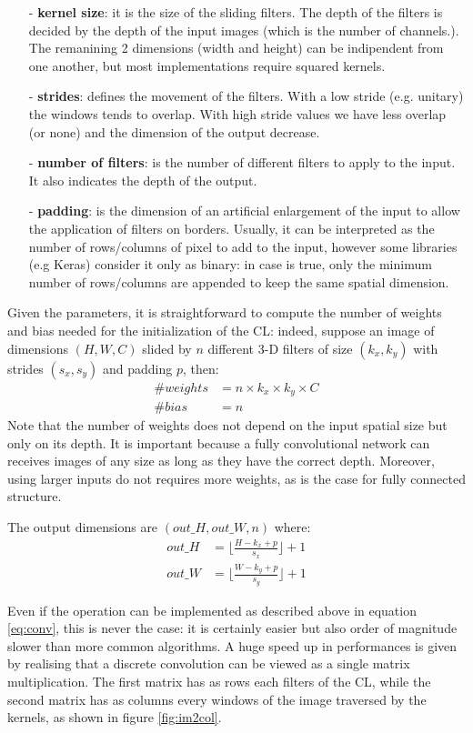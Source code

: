 \documentclass[12pt,a4paper]{report}
\begin{document}
\begin{itemize}
 \setlength\itemsep{-0.2em}
 \item [-] {\bf kernel size}: it is the size of the sliding filters. The depth of the filters is decided by the depth of the input images (which is the number of channels.). The remanining 2 dimensions (width and height) can be indipendent from one another, but most implementations require squared kernels.
 \item [-] {\bf strides}: defines the movement of the filters. With a low stride (e.g. unitary) the windows tends to overlap. With high stride values we have less overlap (or none) and the dimension of the output decrease.
 \item [-] {\bf number of filters}: is the number of different filters to apply to the input. It also indicates the depth of the output.
 \item [-] {\bf padding}: is the dimension of an artificial enlargement of the input to allow the application of filters on borders. Usually, it can be interpreted as the number of rows/columns of pixel to add to the input, however some libraries (e.g Keras) consider it only as binary: in case is true, only the minimum number of rows/columns are appended to keep the same spatial dimension.
\end{itemize}
Given the parameters, it is straightforward to compute the number of weights and bias needed for the initialization of the CL: indeed, suppose an image of dimensions $(H, W, C)$ slided by $n$ different 3-D filters of size $(k_x, k_y)$ with strides $(s_x, s_y)$ and padding $p$, then:
\begin{align}
 \# weights &= n \times k_x \times k_y \times C \\
 \# bias &= n
\end{align}
Note that the number of weights does not depend on the input spatial size but only on its depth. It is important because a fully convolutional network can receives images of any size as long as they have the correct depth. Moreover, using larger inputs do not requires more weights, as is the case for fully connected structure. 

The output dimensions are $(out\_H, out\_W, n)$ where:
\begin{align}
 out\_H &= \lfloor\frac{H - k_x + p}{s_x}\rfloor + 1 \\
 out\_W &= \lfloor\frac{W - k_y + p}{s_y}\rfloor + 1
\end{align}

Even if the operation can be implemented as described above in equation \ref{eq:conv}, this is never the case: it is certainly easier but also order of magnitude slower than more common algorithms.
A huge speed up in performances is given by realising that a discrete convolution can be viewed as a single matrix multiplication. The first matrix has as rows each filters of the CL, while the second matrix has as columns every windows of the image traversed by the kernels, as shown in figure \ref{fig:im2col}.
\end{document}
